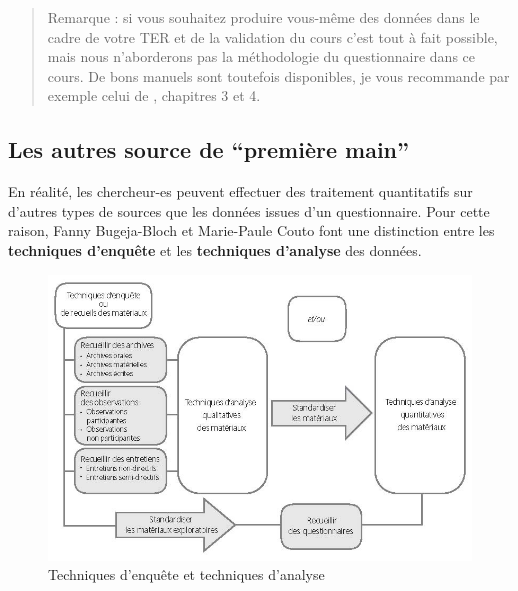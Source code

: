 \documentclass[
]{book}
\begin{document}
\begin{quote}
Remarque : si vous souhaitez produire vous-même des données dans le cadre de votre TER et de la validation du cours c'est tout à fait possible, mais nous n'aborderons pas la méthodologie du questionnaire dans ce cours. De bons manuels sont toutefois disponibles, je vous recommande par exemple celui de \citet{bugeja-bloch2021}, chapitres 3 et 4.
\end{quote}

\hypertarget{les-autres-source-de-premiuxe8re-main}{%
\subsection{Les autres source de ``première main''}\label{les-autres-source-de-premiuxe8re-main}}

En réalité, les chercheur-es peuvent effectuer des traitement quantitatifs sur d'autres types de sources que les données issues d'un questionnaire. Pour cette raison, Fanny Bugeja-Bloch et Marie-Paule Couto font une distinction entre les \textbf{techniques d'enquête} et les \textbf{techniques d'analyse} des données.

\begin{figure}
\centering
\includegraphics{images/techniquesenquete.jpg}
\caption{Techniques d'enquête et techniques d'analyse \citep{bugeja-bloch2021}}
\end{figure}
\end{document}
